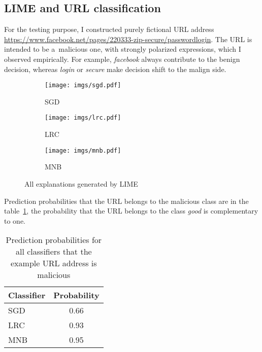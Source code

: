 \subsection{LIME and URL classification}\label{subsec:lime-and-url-classification}

For the testing purpose, I constructed purely fictional URL address \url{https://www.facebook.net/pages/220333-zip-secure/passwordlogin}.
The URL is intended to be a~malicious one, with strongly polarized expressions, which I observed empirically.
For example, \textit{facebook} always contribute to the benign decision, whereas \textit{login} or \textit{secure} make decision shift to the malign side.

\begin{figure}[htb]
    \centering
    \begin{subfigure}{.3\textwidth}
        \texttt{[image: imgs/sgd.pdf]}
        \centering
        \caption{SGD}
        \label{fig:exp_sgd}
    \end{subfigure}
    \hfill
    \begin{subfigure}{.3\textwidth}
        \texttt{[image: imgs/lrc.pdf]}
        \centering
        \caption{LRC}
        \label{fig:exp_lrc}
    \end{subfigure}
    \hfill
    \begin{subfigure}{.3\textwidth}
        \texttt{[image: imgs/mnb.pdf]}
        \centering
        \caption{MNB}
        \label{fig:exp_mnb}
    \end{subfigure}

    \caption{All explanations generated by LIME}
    \label{fig:all-explanations}
\end{figure}
\FloatBarrier

Prediction probabilities that the URL belongs to the malicious class are in the table~\ref{table:prediction-probabilities}, the probability that the URL belongs to the class \textit{good} is complementary to one.

\begin{table}[htb]
    \centering

    \begin{tabular}{lc}
        \toprule
        Classifier & Probability \\
        \midrule
        SGD & 0.66 \\
        LRC & 0.93 \\
        MNB & 0.95 \\
        \bottomrule
    \end{tabular}

    \caption{Prediction probabilities for all classifiers that the example URL address is malicious}
    \label{table:prediction-probabilities}
\end{table}
\FloatBarrier

